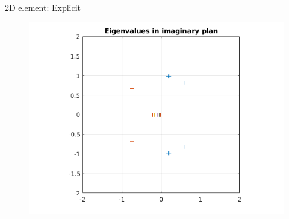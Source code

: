 \begin{frame}{2D element: Explicit}
\begin{figure}[ht] 
  \label{ fig7} 
  \begin{minipage}[b]{0.5\linewidth}
    \centering
    \includegraphics[scale=.35]{images/2D-exp-1.png} \\


\end{minipage}
\end{figure}
\end{frame}
